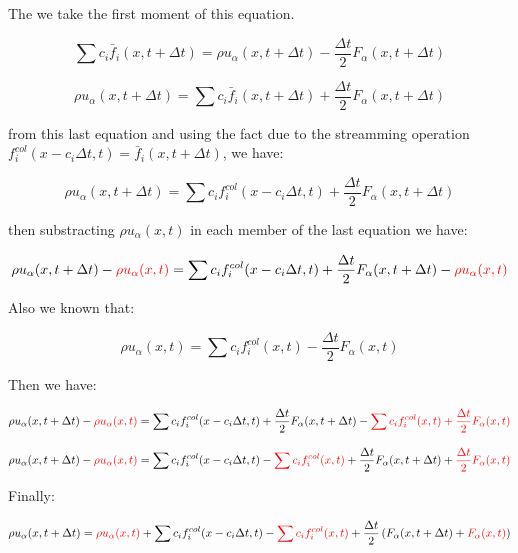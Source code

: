 The we take the first moment of this equation.

\begin{equation}
	\sum{c_i\bar{f}_i(x,t+\Delta t)} = \rho u_\alpha(x,t+\Delta t) - \frac{\Delta t}{2}F_\alpha(x,t+\Delta t)
\end{equation}

\begin{equation}
	\rho u_\alpha(x,t+\Delta t) = \sum{c_i\bar{f}_i(x,t+\Delta t)} + \frac{\Delta t}{2}F_\alpha(x,t+\Delta t)
\end{equation}

from this last equation and using the fact due to the streamming operation
$f_i^{col}(x-c_i\Delta t, t) = \bar{f}_i(x,t+\Delta t)$, we have:

\begin{equation}
	\rho u_\alpha(x,t+\Delta t) = \sum{c_i f_i^{col}(x-c_i\Delta t, t)} + \frac{\Delta t}{2}F_\alpha(x,t+\Delta t)
\end{equation}

then substracting $\rho u_\alpha(x,t)$ in each member of the last equation we have:

\begin{equation}
	\rho u_\alpha(x,t+\Delta t) -\textcolor{red}{\rho u_\alpha(x,t)}= \sum{c_i f_i^{col}(x-c_i\Delta t, t)} + \frac{\Delta t}{2}F_\alpha(x,t+\Delta t) -\textcolor{red}{\rho u_\alpha(x,t)}
\end{equation}

Also we known that:

\begin{equation}
	\rho u_\alpha(x,t) = \sum{c_i{f}_i^{col}(x,t)} - \frac{\Delta t}{2}F_\alpha(x,t)
\end{equation}

Then we have:

\begin{equation}
	\rho u_\alpha(x,t+\Delta t) -\textcolor{red}{\rho u_\alpha(x,t)}= \sum{c_i f_i^{col}(x-c_i\Delta t, t)} + \frac{\Delta t}{2}F_\alpha(x,t+\Delta t) -\textcolor{red}{\sum{c_i{f}_i^{col}(x,t)} + \frac{\Delta t}{2}F_\alpha(x,t)}
\end{equation}

\begin{equation}
	\rho u_\alpha(x,t+\Delta t) -\textcolor{red}{\rho u_\alpha(x,t)}= \sum{c_i f_i^{col}(x-c_i\Delta t, t)} -\textcolor{red}{\sum{c_i{f}_i^{col}(x,t)}}+ \frac{\Delta t}{2}F_\alpha(x,t+\Delta t) + \textcolor{red}{\frac{\Delta t}{2}F_\alpha(x,t)}
\end{equation}

Finally:

\begin{equation}
	\rho u_\alpha(x,t+\Delta t) =\textcolor{red}{\rho u_\alpha(x,t)} + \sum{c_i f_i^{col}(x-c_i\Delta t, t)} -\textcolor{red}{\sum{c_i{f}_i^{col}(x,t)}}+ \frac{\Delta t}{2}\left(F_\alpha(x,t+\Delta t) + \textcolor{red}{{F_\alpha(x,t)}}\right)
\end{equation}